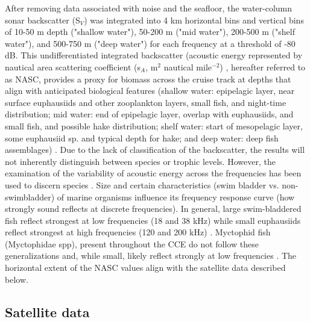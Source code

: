 \documentclass[10pt,letterpaper]{article}
\begin{document}
After removing data associated with noise and the seafloor, the water-column sonar backscatter (S$_{V}$) was integrated into 4 km horizontal bins and vertical bins of 10-50 m depth ("shallow water"), 50-200 m ("mid water"), 200-500 m ("shelf water"), and 500-750 m ("deep water") for each frequency at a threshold of -80 dB. This undifferentiated integrated backscatter (acoustic energy represented by nautical area scattering coefficient (s$_{A}$, m$^{2}$ nautical mile$^{-2}$) \cite{maclennan2002consistent}, hereafter referred to as NASC, provides a proxy for biomass across the cruise track at depths that align with anticipated biological features (shallow water: epipelagic layer, near surface euphausiids and other zooplankton layers, small fish, and night-time distribution; mid water: end of epipelagic layer, overlap with euphausiids, and small fish, and possible hake distribution; shelf water: start of mesopelagic layer, some euphausiid sp. and typical depth for hake; and deep water: deep fish assemblages) \cite{whitehead1985clupeoid} \cite{benoit2004diel} \cite{ressler2005spatial} \cite{ressler2007pacific}. Due to the lack of classification of the backscatter, the results will not inherently distinguish between species or trophic levels. However, the examination of the variability of acoustic energy across the frequencies has been used to discern species \cite{de2010development} \cite{korneliussen2002operational}. Size and certain characteristics (swim bladder vs. non-swimbladder) of marine organisms influence its frequency response curve (how strongly sound reflects at discrete frequencies). In general, large swim-bladdered fish reflect strongest at low frequencies (18 and 38 kHz) while small euphausiids reflect strongest at high frequencies (120 and 200 kHz) \cite{trenkel2013fisheries}. Myctophid fish (Myctophidae spp), present throughout the CCE do not follow these generalizations and, while small, likely reflect strongly at low frequencies \cite{benoit2009effects}. The horizontal extent of the NASC values align with the satellite data described below. 

\subsection*{Satellite data}
\end{document}
